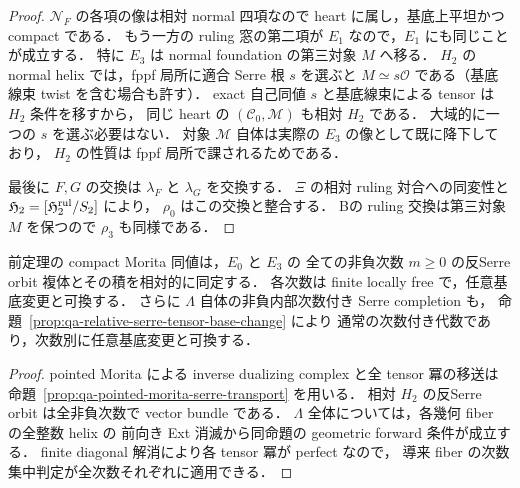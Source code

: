 \begin{proof}
$\mathcal N_F$ の各項の像は相対 normal 四項なので
heart に属し，基底上平坦かつ compact である．
もう一方の ruling 窓の第二項が $E_1$ なので，$E_1$ にも同じことが成立する．
特に $E_3$ は normal foundation の第三対象 $M$ へ移る．
$H_2$ の normal helix では，fppf 局所に適合 Serre 根 $s$ を選ぶと
$M\simeq s\mathcal O$ である（基底線束 twist を含む場合も許す）．
exact 自己同値 $s$ と基底線束による tensor は $H_2$ 条件を移すから，
同じ heart の $(\mathcal C_0,\mathcal M)$ も相対 $H_2$ である．
大域的に一つの $s$ を選ぶ必要はない．
対象 $\mathcal M$ 自体は実際の $E_3$ の像として既に降下しており，
$H_2$ の性質は fppf 局所で課されるためである．

最後に $F,G$ の交換は $\lambda_F$ と $\lambda_G$ を交換する．
$\Xi$ の相対 ruling 対合への同変性と
$\mathfrak H_2=[\mathfrak H_2^{\mathrm{rul}}/S_2]$ により，
$\rho_0$ はこの交換と整合する．
Bの ruling 交換は第三対象 $M$ を保つので $\rho_3$ も同様である．
\end{proof}

\begin{corollary}
\label{cor:qa-relative-avatar-all-serre-degrees}
前定理の compact Morita 同値は，$E_0$ と $E_3$ の
全ての非負次数 $m\ge0$ の反Serre orbit 複体とその積を相対的に同定する．
各次数は finite locally free で，任意基底変更と可換する．
さらに $\Lambda$ 自体の非負内部次数付き Serre completion も，
命題~\ref{prop:qa-relative-serre-tensor-base-change} により
通常の次数付き代数であり，次数別に任意基底変更と可換する．
\end{corollary}
\begin{proof}
pointed Morita による inverse dualizing complex と全 tensor 冪の移送は
命題~\ref{prop:qa-pointed-morita-serre-transport} を用いる．
相対 $H_2$ の反Serre orbit は全非負次数で vector bundle である．
$\Lambda$ 全体については，各幾何 fiber の全整数 helix の
前向き Ext 消滅から同命題の geometric forward 条件が成立する．
finite diagonal 解消により各 tensor 冪が perfect なので，
導来 fiber の次数集中判定が全次数それぞれに適用できる．
\end{proof}

